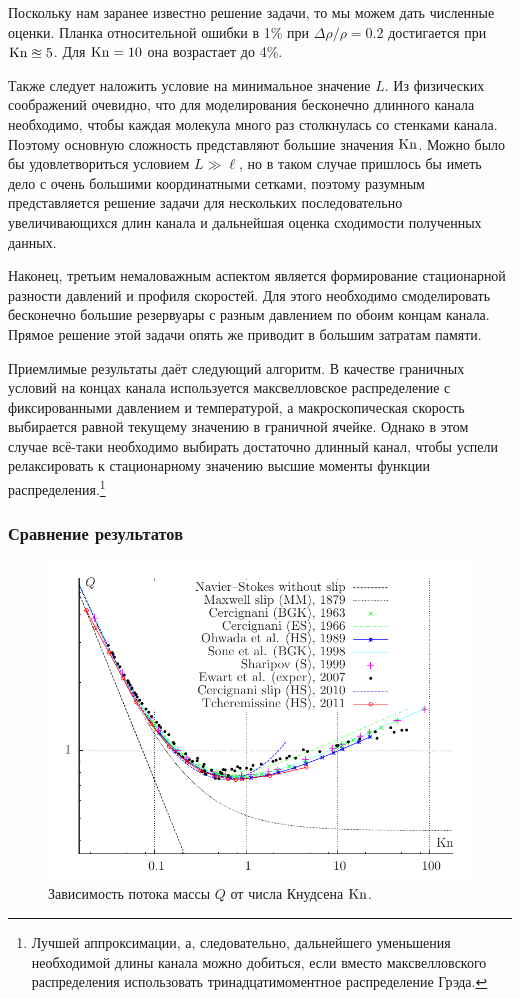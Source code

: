 Поскольку нам заранее известно решение задачи, то мы можем дать численные оценки.
Планка относительной ошибки в 1\% при \(\Delta\rho/\rho = 0.2\) достигается при \(\mathrm{Kn} \approxeq 5\).
Для \(\mathrm{Kn}=10\) она возрастает до 4\%.

Также следует наложить условие на минимальное значение \(L\). Из физических соображений очевидно, что
для моделирования бесконечно длинного канала необходимо, чтобы каждая молекула много раз столкнулась со
стенками канала. Поэтому основную сложность представляют большие значения \(\mathrm{Kn}\). Можно было бы удовлетвориться
условием \(L \gg \ell\), но в таком случае пришлось бы иметь дело с очень большими координатными сетками,
поэтому разумным представляется решение задачи для нескольких последовательно увеличивающихся длин канала и
дальнейшая оценка сходимости полученных данных.

Наконец, третьим немаловажным аспектом является формирование стационарной разности давлений и профиля скоростей.
Для этого необходимо смоделировать бесконечно большие резервуары с разным давлением по обоим концам канала.
Прямое решение этой задачи опять же приводит в большим затратам памяти.

Приемлимые результаты даёт следующий алгоритм.
В качестве граничных условий на концах канала используется максвелловское распределение с фиксированными давлением и температурой,
а макроскопическая скорость выбирается равной текущему значению в граничной ячейке.
Однако в этом случае всё-таки необходимо выбирать достаточно длинный канал,
чтобы успели релаксировать к стационарному значению высшие моменты функции распределения.\footnote
{
	Лучшей аппроксимации, а, следовательно, дальнейшего уменьшения необходимой длины канала можно добиться,
	если вместо максвелловского распределения использовать тринадцатимоментное распределение Грэда.
}

\subsubsection{Сравнение результатов}

\begin{figure}[ht]
	\centering
	\includegraphics{problems/poiseuille.pdf}
	\caption{Зависимость потока массы \(Q\) от числа Кнудсена \(\mathrm{Kn}\).}\label{fig:graph}
\end{figure}

